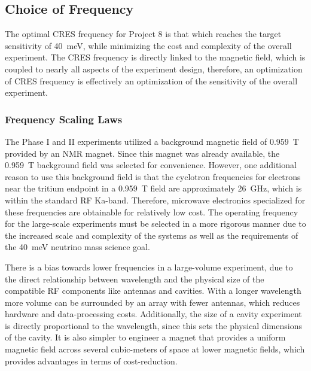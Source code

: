 \subsection{Choice of Frequency}
The optimal CRES frequency for Project 8 is that which reaches the target sensitivity of 40~meV, while minimizing the cost and complexity of the overall experiment. The CRES frequency is directly linked to the magnetic field, which is coupled to nearly all aspects of the experiment design, therefore, an optimization of CRES frequency is effectively an optimization of the sensitivity of the overall experiment. %

\subsubsection*{Frequency Scaling Laws}

The Phase I and II experiments utilized a background magnetic field of 0.959~T provided by an NMR magnet. Since this magnet was already available, the 0.959~T background field was selected for convenience. However, one additional reason to use this background field is that the cyclotron frequencies for electrons near the tritium endpoint in a 0.959~T field are approximately 26~GHz, which is within the standard RF Ka-band. Therefore, microwave electronics specialized for these frequencies are obtainable for relatively low cost. The operating frequency for the large-scale experiments must be selected in a more rigorous manner due to the increased scale and complexity of the systems as well as the requirements of the 40~meV neutrino mass science goal.

There is a bias towards lower frequencies in a large-volume experiment, due to the direct relationship between wavelength and the physical size of the compatible RF components like antennas and cavities. With a longer wavelength more volume can be surrounded by an array with fewer antennas, which reduces hardware and data-processing costs. Additionally, the size of a cavity experiment is directly proportional to the wavelength, since this sets the physical dimensions of the cavity. It is also simpler to engineer a magnet that provides a uniform magnetic field across several cubic-meters of space at lower magnetic fields, which provides advantages in terms of cost-reduction.

